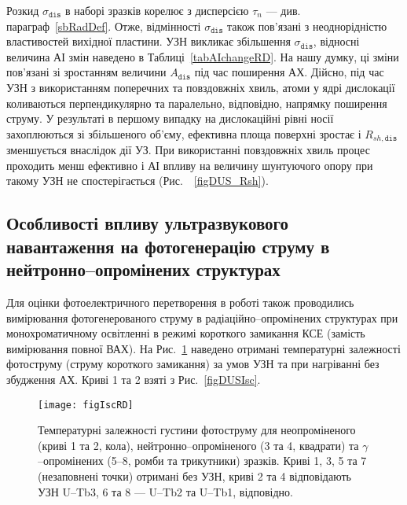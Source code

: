 Розкид $\sigma_{\mathtt{dis}}$ в наборі зразків корелює з дисперсією $\tau_n$ --- див. параграф~\ref{sbRadDef}.
Отже, відмінності $\sigma_{\mathtt{dis}}$ також пов'язані з неоднорідністю
властивостей вихідної пластини.
УЗН викликає збільшення $\sigma_{\mathtt{dis}}$, відносні величина АІ змін
наведено в Таблиці~\ref{tabAIchangeRD}.
На нашу думку, ці зміни пов'язані зі зростанням величини $A_\mathtt{dis}$ під час поширення АХ.
Дійсно, під час УЗН з використанням поперечних та повздовжніх хвиль,
атоми у ядрі дислокації коливаються перпендикулярно та паралельно, відповідно, напрямку поширення струму.
У результаті в першому випадку на дислокаційні рівні носії захоплюються зі збільшеного об'єму,
ефективна площа поверхні зростає і $R_{sh,\mathtt{dis}}$ зменшується внаслідок дії УЗ.
При використанні повздовжніх хвиль процес проходить менш ефективно і АІ впливу на величину
шунтуючого опору при такому УЗН не спостерігається (Рис.~~\ref{figDUS_Rsh}).

\subsection{Особливості впливу ультразвукового навантаження на фотогенерацію струму в нейтронно--опромінених структурах\label{sbNIsc}}

Для оцінки фотоелектричного перетворення в роботі також проводились вимірювання фотогенерованого струму
в радіаційно--опромінених структурах
при монохроматичному освітленні в режимі короткого замикання КСЕ (замість вимірювання повної ВАХ).
На Рис.~\ref{figIscRD} наведено отримані температурні залежності фотоструму (струму короткого замикання)
за умов УЗН та при нагріванні без збудження АХ.
Криві 1 та 2 взяті з Рис.~\ref{figDUSIsc}.




\begin{figure}[b]
\center
\texttt{[image: figIscRD]}
\caption{\label{figIscRD}
Температурні залежності густини фотоструму
для неопроміненого (криві 1 та 2, кола),
нейтронно--опроміненого (3 та 4, квадрати) та
$\gamma$--опромінених (5--8, ромби та трикутники)
зразків.
Криві 1, 3, 5 та 7 (незаповнені точки) отримані без УЗН,
криві 2 та 4 відповідають УЗН U--Tb3,
6 та 8 ---
U--Tb2 та U--Tb1, відповідно.
}%
\end{figure}

